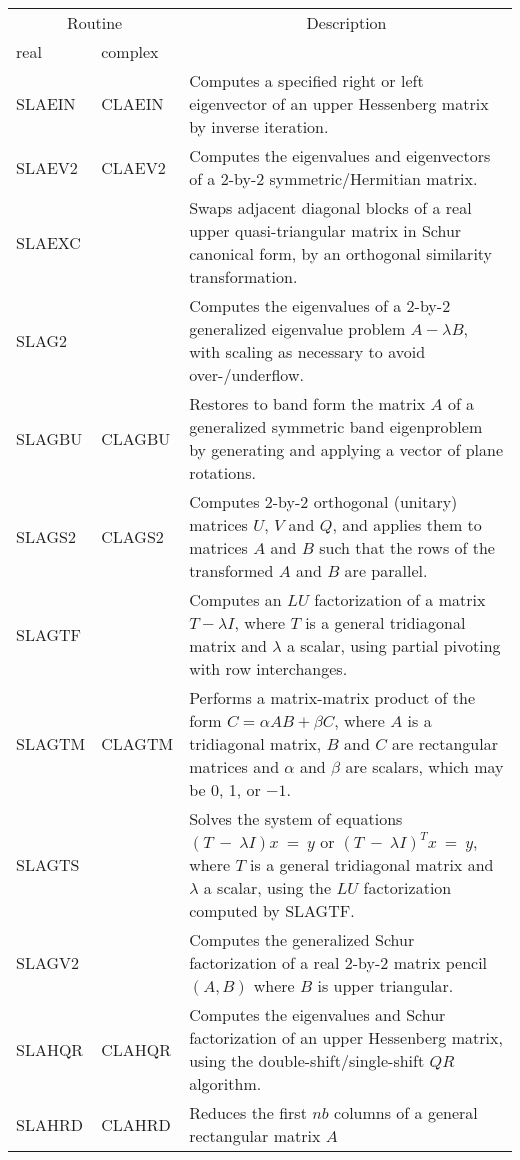 \begin{center}
\begin{tabular}{| l   p{0.75in} |p{4.5in}    |}
\hline \multicolumn{2}{|c|}{Routine}&\multicolumn{1}{c|}{Description} \\ 
\cline{1-2} real&complex&\\
\hline \hline
SLAEIN&CLAEIN&
Computes a specified right or left eigenvector of an upper Hessenberg matrix
by inverse iteration.\\
SLAEV2&CLAEV2&
Computes the eigenvalues and eigenvectors of a 2-by-2 symmetric/Hermitian 
matrix.\\
SLAEXC&&
Swaps adjacent diagonal blocks of a real upper quasi-triangular matrix 
in Schur canonical form,
by an orthogonal similarity transformation.\\
SLAG2&&
Computes the eigenvalues of a 2-by-2 generalized eigenvalue problem
$A - \lambda B$, with scaling as necessary to avoid over-/underflow.  \\
SLAGBU&CLAGBU&
Restores to band form the matrix $A$ of a generalized symmetric band eigenproblem
by generating and applying a vector of plane rotations.\\
SLAGS2&CLAGS2&
Computes 2-by-2 orthogonal (unitary) matrices $U$, $V$ and $Q$, and applies
them to matrices $A$ and $B$ such that the rows of the transformed
$A$ and $B$ are parallel.\\
SLAGTF&&
Computes an $LU$ factorization of a matrix $T - \lambda I$, 
where $T$ is a general tridiagonal matrix and $\lambda$ a scalar,
using partial pivoting with row interchanges.\\
SLAGTM&CLAGTM&
Performs a matrix-matrix product of the form $C = \alpha A B + \beta C$,
where $A$ is a tridiagonal matrix, 
$B$ and $C$ are rectangular matrices
and $\alpha$ and $\beta$ are scalars, which may be 0, 1, or $-1$.\\
SLAGTS&&
Solves the system of equations 
$(T~-~\lambda I) x~=~y$ or $(T~-~\lambda I)^T x~=~y$,
where $T$ is a general tridiagonal matrix and $\lambda$ a scalar,
using the $LU$ factorization computed by SLAGTF.\\
SLAGV2&&
Computes the generalized Schur factorization of a real 2-by-2
matrix pencil $(A,B)$ where $B$ is upper triangular.\\
SLAHQR&CLAHQR&
Computes the eigenvalues and Schur factorization of an upper Hessenberg matrix, 
using the double-shift/single-shift $QR$ algorithm.\\
SLAHRD&CLAHRD&
Reduces the first $nb$ columns of a general rectangular matrix $A$

\end{tabular}
\end{center}
